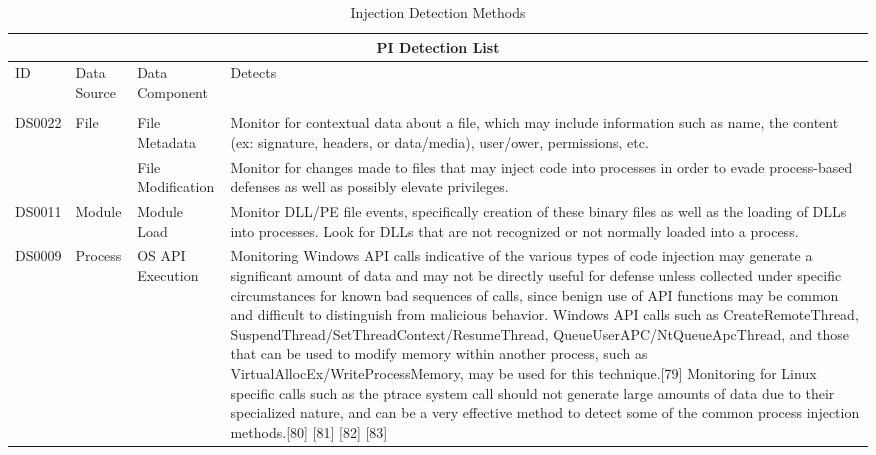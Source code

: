 \documentclass{article}
\begin{document}
\begin{table}[h!]
\centering
\caption{Injection Detection Methods \autocite{Mitre:2017}}
\begin{tabular}{ |p{1.2cm}||p{2cm}|p{3cm}|p{8cm}|  }
  \hline
  \multicolumn{4}{|c|}{PI Detection List} \\
  \hline
  ID	& Data Source & Data Component & Detects \\
  \hline
   & & & \\
  DS0022 & File & File Metadata & Monitor for contextual data about a file, which may include information such as name,
                                  the content (ex: signature, headers, or data/media), user/ower, permissions, etc. \\
        & & File Modification & Monitor for changes made to files that may inject code into processes in order to evade
                                process-based defenses as well as possibly elevate privileges. \\
  \hline
  DS0011 & Module & Module Load & Monitor DLL/PE file events, specifically creation of these binary files as well as
                                  the loading of DLLs into processes. Look for DLLs that are not recognized or not
                                  normally loaded into a process. \\
  \hline
  DS0009 & Process & OS API Execution & Monitoring Windows API calls indicative of the various types of code injection
                                        may generate a significant amount of data and may not be directly useful for
                                        defense unless collected under specific circumstances for known bad sequences
                                        of calls, since benign use of API functions may be common and difficult to
                                        distinguish from malicious behavior. Windows API calls such as CreateRemoteThread,
                                        SuspendThread/SetThreadContext/ResumeThread, QueueUserAPC/NtQueueApcThread, and
                                        those that can be used to modify memory within another process, such as
                                        VirtualAllocEx/WriteProcessMemory, may be used for this technique.[79] Monitoring
                                        for Linux specific calls such as the ptrace system call should not generate large
                                        amounts of data due to their specialized nature, and can be a very effective
                                        method to detect some of the common process injection methods.[80] [81] [82] [83] \\

\end{tabular}
\end{table}
\end{document}
